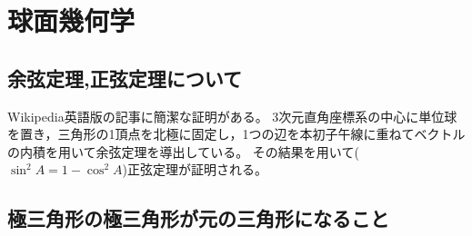 \chapter{球面幾何学}
    \section{余弦定理,正弦定理について}
        Wikipedia英語版の記事に簡潔な証明がある。
        3次元直角座標系の中心に単位球を置き，三角形の1頂点を北極に固定し，1つの辺を本初子午線に重ねてベクトルの内積を用いて余弦定理を導出している。
        その結果を用いて($\sin^2 A = 1 - \cos^2 A$)正弦定理が証明される。
    \section{極三角形の極三角形が元の三角形になること}
